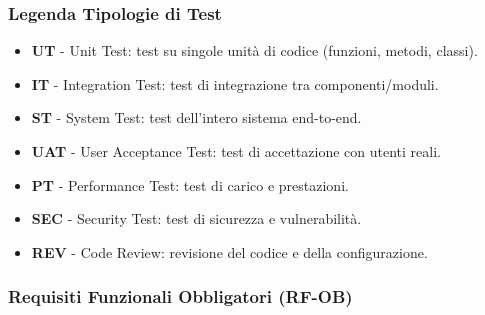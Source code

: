 \documentclass[a4paper,11pt,oneside]{scrartcl}
\begin{document}
\subsubsection{Legenda Tipologie di Test}

\begin{itemize}[leftmargin=1.5cm]
    \item \textbf{UT} - Unit Test: test su singole unità di codice (funzioni, metodi, classi).
    \item \textbf{IT} - Integration Test: test di integrazione tra componenti/moduli.
    \item \textbf{ST} - System Test: test dell'intero sistema end-to-end.
    \item \textbf{UAT} - User Acceptance Test: test di accettazione con utenti reali.
    \item \textbf{PT} - Performance Test: test di carico e prestazioni.
    \item \textbf{SEC} - Security Test: test di sicurezza e vulnerabilità.
    \item \textbf{REV} - Code Review: revisione del codice e della configurazione.
\end{itemize}


\subsubsection{Requisiti Funzionali Obbligatori (RF-OB)}
\end{document}
